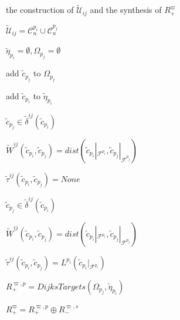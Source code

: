 \documentclass[journal]{IEEEtran}
\begin{document}
\begin{algorithm}
  \caption{the construction of $\widetilde{\mathcal{U}}_{ij}$ and the synthesis of $R^{\varpi}_+$}
  $\widetilde{\mathcal{U}}_{ij}=\mathcal{C}^{p_i}_n\cup \mathcal{C}^{p_j}_n$

  $\tilde{\eta}_{p_i}=\emptyset,\Omega_{p_j}=\emptyset$

  {
    {
        add $\tilde{c}_{p_j}$ to $\Omega_{p_j}$
    }
    {
        {
            add $\tilde{c}_{p_i}$ to $\tilde{\eta}_{p_i}$

            {
                $\tilde{c}_{p_j}\in \tilde{\delta}^{ij}(\tilde{c}_{p_i})$

                $\widetilde{W}^{ij}(\tilde{c}_{p_i},\tilde{c}_{p_j})=dist(\tilde{c}_{p_i}|_{\mathcal{F}^{p_i}},\tilde{c}_{p_j}|_{\mathcal{F}^{p_j}})$

                $\tilde{\tau}^{ij}(\tilde{c}_{p_i},\tilde{c}_{p_j}) = None$
            }
            \Else
            {
                {
                    $\tilde{c}_{p_j}\in \tilde{\delta}^{ij}(\tilde{c}_{p_i})$

                    $\widetilde{W}^{ij}(\tilde{c}_{p_i},\tilde{c}_{p_j})=dist(\tilde{c}_{p_i}|_{\mathcal{F}^{p_i}},\tilde{c}_{p_j}|_{\mathcal{F}^{p_j}})$

                    $\tilde{\tau}^{ij}(\tilde{c}_{p_i},\tilde{c}_{p_j})=L^{p_i}(\tilde{c}_{p_i}|_{\mathcal{F}^{p_i}})$
                }
            }
        }
    }
  }
  $R^{\varpi,p}_+=DijksTargets(\Omega_{p_j},\tilde{\eta}_{p_i})$

  $R^{\varpi}_+ = R^{\varpi,p}_+ \oplus R^{\varpi,s}_-$

\end{algorithm}
\end{document}

